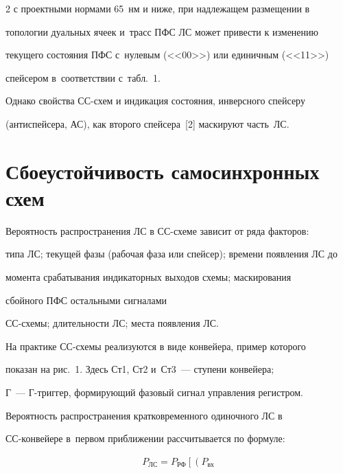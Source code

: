 \begin{multicols}{2}
с проектными нормами 65~нм и ниже, при надлежащем размещении в 

топологии дуальных ячеек и~трасс ПФС ЛС может привести к изменению 

текущего состояния ПФС с~нулевым (<<00>>) или единичным (<<11>>) 

спейсером в~соответствии с~табл.~1.

   

  Однако свойства СС-схем и индикация состояния, инверсного спейсеру 

(антиспейсера, АС), как второго спейсера~[2] маскируют часть~ЛС.










\section{Сбоеустойчивость самосинхронных схем}



  Вероятность распространения ЛС в СС-схе\-ме зависит от ряда факторов: 

типа ЛС; текущей фазы (рабочая фаза или спейсер); времени появления ЛС до 

момента срабатывания индикаторных выходов схемы; маскирования 

сбойного ПФС остальными сигналами 

  СС-схе\-мы; длительности ЛС; места появления ЛС.

  

  На практике СС-схе\-мы реализуются в виде конвейера, пример которого 

показан на рис.~1. Здесь Ст1, Ст2 и~Ст3~--- ступени конвейера; 

Г~--- Г-триг\-гер, формирующий фазовый сигнал управления ре\-гист\-ром.

   

  Вероятность распространения кратковременного одиночного ЛС в 

СС-кон\-вей\-ере в~первом приближении рассчитывается по формуле:



\noindent

  \begin{multline}

  P_{\mathrm{ЛС}}=P_{\mathrm{РФ}}\left[ \left( P_{\mathrm{вх}} 


\end{multline}
\end{multicols}
